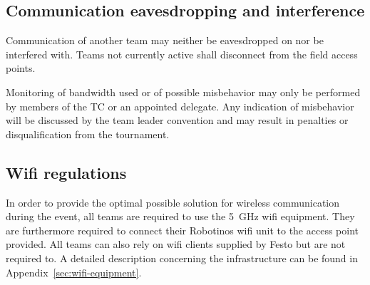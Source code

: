 \documentclass[12pt,twoside]{article}
\newenvironment{rulechange}{}{}
\begin{document}
\subsection{Communication eavesdropping and interference}
\label{sec:comm-tampering}
Communication of another team may neither be eavesdropped on nor be
interfered with. Teams not currently active shall disconnect from the
field access points.

Monitoring of bandwidth used or of possible misbehavior may only be
performed by members of the TC or an appointed delegate.
Any indication of misbehavior will be discussed by the team leader
convention and may result in penalties or disqualification from the
tournament.



\subsection{Wifi regulations}
\label{sec:wifi-regulations}
In order to provide the optimal possible solution for wireless
communication during the event, all teams are required to use the
\SI{5}{\giga\hertz} wifi equipment. They are furthermore required to
connect their Robotinos wifi unit to the access point provided. All
teams can also rely on wifi clients supplied by Festo but are not
required to. A detailed description concerning the infrastructure can
be found in Appendix~\ref{sec:wifi-equipment}.
\end{document}
